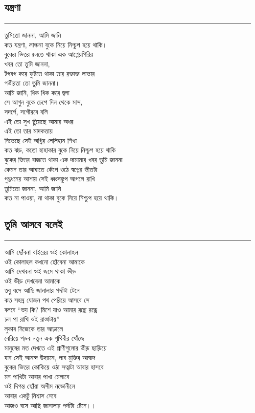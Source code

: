 \documentclass[12pt]{article}
\begin{document}
\subsection*{যন্ত্রণা }
\hrule
\vspace{1in}
তুমিতো জাননা, আমি জানি\\
কত যন্ত্রণা, লাঞ্চনা বুকে নিয়ে নিশ্চুপ হয়ে থাকি।\\
বুকের ভিতর জ্বলতে থাকা এক আগ্নেয়গিরির\\
খবর তো তুমি জাননা,\\
টগবগ করে ফুটতে থাকা তার রক্তাক্ত লাভার\\
গভীরতা তো তুমি জাননা।\\
আমি জানি, ধিক ধিক করে জ্বলা\\
সে আগুন বুকে চেপে দিন থেকে মাস,\\
সদর্পে, সগৌরবে বলি\\
এই তো সুখ ছুঁয়েছে আমার অধর\\
এই তো তার মাদকতায়\\
নিভেছে সেই অগ্নির লেলিহান শিখা\\
কত ঝড়, কতো হাহাকার বুকে নিয়ে নিশ্চুপ হয়ে থাকি\\
বুকের ভিতর বাজতে থাকা এক দামামার খবর তুমি জাননা\\
কেমন তার আঘাতে কেঁপে ওঠে স্বপ্নের ভীতটা\\
গুপ্তধনের আশায় সেই ধ্বংসস্তুপ আগলে রাখি\\
তুমিতো জাননা, আমি জানি\\
কত না পাওয়া, না থাকা বুকে নিয়ে নিশ্চুপ হয়ে থাকি। \\
\newpage

\subsection*{তুমি আসবে বলেই }
\hrule
\vspace{1in}
আমি ছোঁবনা বাইরের ওই কোলাহল\\
ওই কোলাহল কখনো ছোঁবেনা আমাকে\\
আমি দেখবনা ওই জমে থাকা ভীড়\\
ওই ভীড় দেখবেনা আমাকে\\
তবু বসে আছি জানালার পর্দাটা টেনে\\
কত সহস্র যোজন পথ পেরিয়ে আসবে সে\\
বলবে ``ভয় কি? মিশে যাও আমার রন্ধ্রে রন্ধ্রে\\
চল পা রাখি ওই রাস্তাটায়''\\
লুকাব নিজেকে তার আড়ালে\\
বেরিয়ে পড়ব নতুন এক পৃথিবীর খোঁজে\\
মানুষের মত দেখতে এই প্রাণীগুলোর ভীড় ছাড়িয়ে\\
যাব সেই আনন্দ উদ্যানে, পাব মুক্তির আস্বাদ\\
বুকের ভিতর কোকিয়ে ওঠা সত্বাটা আবার হাসবে\\
মন পাখিটা আবার পাখা মেলাবে\\
ওই দিগন্ত ছোঁয়া অসীম নভোনীলে\\
আবার একটু নিশ্বাস নেবে\\
আজও বসে আছি জানালার পর্দাটা টেনে।।\\
\newpage
\end{document}
